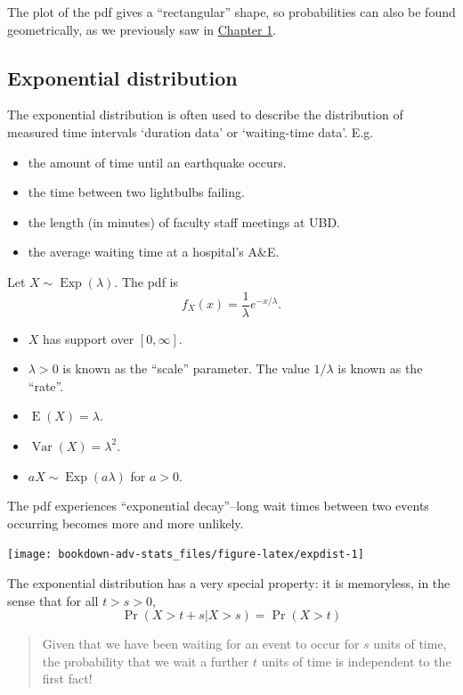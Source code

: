 \documentclass[
]{book}
\providecommand{\tightlist}{%
  \setlength{\itemsep}{0pt}\setlength{\parskip}{0pt}}
\DeclareMathOperator{\E}{E}
\DeclareMathOperator{\Var}{Var}
\DeclareMathOperator{\Exp}{Exp}
\theoremstyle{definition}
\theoremstyle{definition}
\theoremstyle{definition}
\theoremstyle{definition}
\theoremstyle{remark}
\begin{document}
The plot of the pdf gives a ``rectangular'' shape, so probabilities can also be found geometrically, as we previously saw in \protect\hyperlink{exm:unitsquare}{Chapter 1}.

\hypertarget{exponential-distribution}{%
\subsection{Exponential distribution}\label{exponential-distribution}}

The exponential distribution is often used to describe the distribution of measured time intervals `duration data' or `waiting-time data'. E.g.

\begin{itemize}
\tightlist
\item
  the amount of time until an earthquake occurs.
\item
  the time between two lightbulbs failing.
\item
  the length (in minutes) of faculty staff meetings at UBD.
\item
  the average waiting time at a hospital's A\&E.
\end{itemize}

Let \(X\sim\Exp(\lambda)\).
The pdf is
\[
f_X(x) = \frac{1}{\lambda} e^{-x/\lambda}.
\]

\begin{itemize}
\tightlist
\item
  \(X\) has support over \([0,\infty]\).
\item
  \(\lambda >0\) is known as the ``scale'' parameter. The value \(1/\lambda\) is known as the ``rate''.
\item
  \(\E(X)=\lambda\).
\item
  \(\Var(X)=\lambda^2\).
\item
  \(aX\sim\Exp(a\lambda)\) for \(a>0\).
\end{itemize}

The pdf experiences ``exponential decay''--long wait times between two events occurring becomes more and more unlikely.

\begin{center}\texttt{[image: bookdown-adv-stats\_files/figure-latex/expdist-1]} \end{center}

The exponential distribution has a very special property: it is
memoryless, in the sense that for all \(t>s>0\),
\[
\Pr(X > t+s|X>s) = \Pr(X > t)
\]

\begin{quote}
Given that we have been waiting for an event to occur for \(s\) units of time, the probability that we wait a further \(t\) units of time is independent to the first fact!
\end{quote}
\end{document}
